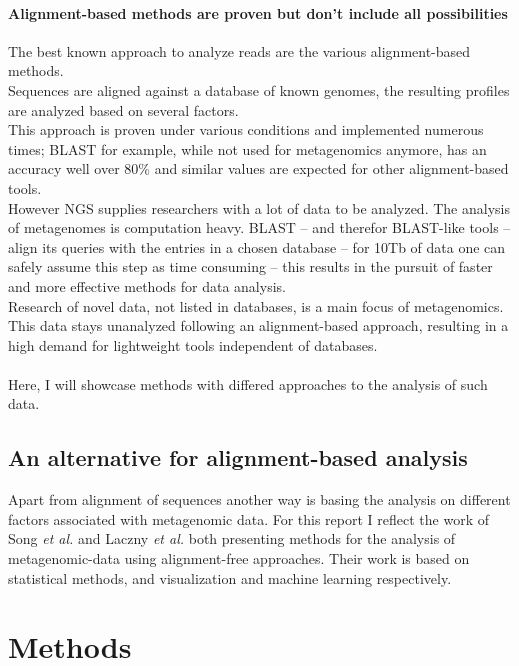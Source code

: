 \documentclass[twocolumn]{bmcart}%
\begin{document}
\paragraph*{Alignment-based methods are proven but don't include all possibilities}
The best known approach to analyze reads are the various alignment-based methods.\\
Sequences are aligned against a database of known genomes, the resulting profiles are analyzed based on several factors.\\
This approach is proven under various conditions and implemented numerous times; BLAST for example, while not used for metagenomics anymore, has an accuracy well over 80\%\cite{doi:10.1142/9789814295291_0003} and similar values are expected for other alignment-based tools.\\
However NGS supplies researchers with a lot of data to be analyzed. The analysis of metagenomes is computation heavy. BLAST -- and therefor BLAST-like tools -- align its queries with the entries in a chosen database -- for 10Tb of data one can safely assume this step as time consuming -- this results in the pursuit of faster and more effective methods for data analysis.\\
Research of  novel data, not listed in databases, is a main focus of metagenomics. This data stays unanalyzed following an alignment-based approach, resulting in a high demand for lightweight tools independent of databases.
\paragraph*{}
Here, I will showcase methods with differed approaches to the analysis of such data. 
\subsection*{An alternative for alignment-based analysis}
Apart from alignment of sequences another way is basing the analysis on different factors associated with metagenomic data. For this report I reflect the work of Song \textit{et al.} \cite{doi:10.1093/bib/bbt067} and Laczny \textit{et al.} \cite{Laczny2014} both presenting methods for the analysis of metagenomic-data using alignment-free approaches. Their work is based on statistical methods, and visualization and machine learning respectively.
\section*{Methods}
\end{document}
